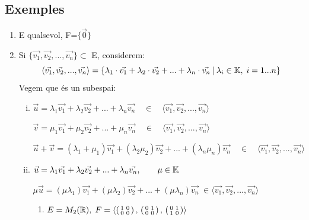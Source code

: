 \documentclass[a4paper, 11pt]{article}
\begin{document}
\subsection*{Exemples}
\begin{enumerate}[$\bullet$]
	\item E qualsevol, F=$\{\vec{0}\}$
	\item Si $\{\vec{v_1}, \vec{v_2}, ..., \vec{v_n}\} \subset$ E, considerem:
	\begin{equation*}
		\langle\vec{v_1}, \vec{v_2}, ..., \vec{v_n}\rangle = \{\lambda_1\cdot\vec{v_1} + \lambda_2\cdot\vec{v_2} + ... + \lambda_n\cdot\vec{v_n} \: | \: \lambda_i \in \mathbb{K}, \; i=1...n\}
	\end{equation*}
	Vegem que és un subespai:
	\begin{enumerate}[(i)]
		\item $\vec{u}=\lambda_1\vec{v_1} + \lambda_2\vec{v_2} + ... + \lambda_n\vec{v_n} \quad \in \quad \langle\vec{v_1}, \vec{v_2}, ..., \vec{v_n}\rangle$
		
		$\vec{v}=\mu_1\vec{v_1} + \mu_2\vec{v_2} + ... + \mu_n\vec{v_n} \quad \in \quad \langle\vec{v_1}, \vec{v_2}, ..., \vec{v_n}\rangle$
		
		\bigskip
		
		$\vec{u}+\vec{v}=(\lambda_1+\mu_1)\vec{v_1} + (\lambda_2\mu_2)\vec{v_2} + ... + (\lambda_n\mu_n)\vec{v_n} \quad \in \quad \langle\vec{v_1}, \vec{v_2}, ..., \vec{v_n}\rangle$
		
		\medskip
		
		\item $\vec{u} = \lambda_1\vec{v_1} + \lambda_2\vec{v_2} + ... +\lambda_n\vec{v_n}, \qquad \mu \in \mathbb{K}$
		
		$\mu \vec{u} = (\mu \lambda_1)\vec{v_1} + (\mu \lambda_2)\vec{v_2} + ... + (\mu \lambda_n)\vec{v_n} \; \in \langle \vec{v_1}, \vec{v_2}, ..., \vec{v_n} \rangle$
		
		\medskip
		
		\begin{enumerate}[$\diamond$]
			\item $E=M_2(\mathbb{R}), \; F = \langle \left( \begin{smallmatrix}
				1 & 0 \\ 0 & 0
			\end{smallmatrix} \right), \,
		\left( \begin{smallmatrix}
			0 & 1 \\ 0 & 0
		\end{smallmatrix} \right), \, 
		\left( \begin{smallmatrix}
		0 & 1 \\ 1 & 0
		\end{smallmatrix} \right) \rangle$
		

\end{enumerate}
\end{enumerate}
\end{enumerate}
\end{document}
